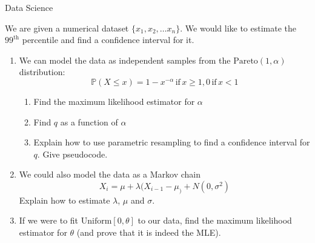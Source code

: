\documentclass{tripos}  %
\begin{document}
\begin{question}[MockIB,year=2024,paper=1,question=2,author=rrw]{Data Science}


  We are given a numerical dataset $\{ x_1, x_2, \dots{} x_n\}$. We would like to estimate the ${99}^{\mbox{th}}$ percentile and find a confidence interval for it.
  
  \begin{enumerate}
  \item We can model the data as independent samples from the $\mbox{Pareto}(1,\alpha)$ distribution:
    \[
    \mathbb{P}(X \leq x) = 1-x^{-\alpha}\, \mbox{if}\, x \ge 1 , 0\,\mbox{if}\, x < 1
    \]
    \begin{enumerate}
    \item Find the maximum likelihood estimator for $\alpha$ 
    \item Find $q$ as a function of $\alpha$ 
    \item Explain how to use parametric resampling to find a confidence interval for $q$. Give pseudocode. 
    \end{enumerate}
  \item We could also model the data as a Markov chain
    \[
    X_i = \mu{} + \lambda{}(X_{i-1}-\mu_) + N(0,\sigma^2)
    \]
    Explain how to estimate $\lambda{}$, $\mu{}$ and $\sigma{}$.
\item If we were to fit $\mbox{Uniform}[0,\theta]$ to our data, find the maximum likelihood estimator for $\theta$ (and prove that it is indeed the MLE). 
    \end{enumerate}

\end{question}
\end{document}
